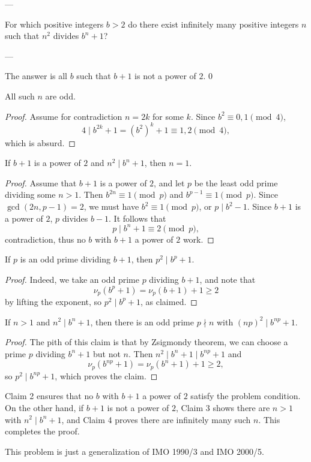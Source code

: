 
---

For which positive integers $b>2$ do there exist infinitely many positive integers $n$ such that $n^2$ divides $b^n+1$?

---

The answer is all $b$ such that $b+1$ is not a power of $2$.
\setcounter{iclaim}0
\begin{iclaim}
    All such $n$ are odd.
\end{iclaim}
\begin{proof}
    Assume for contradiction $n=2k$ for some $k$. Since $b^2\equiv0,1\pmod4$, \[4\mid b^{2k}+1=\left(b^2\right)^k+1\equiv1,2\pmod4,\]
    which is absurd.
\end{proof}
\begin{iclaim}
    If $b+1$ is a power of $2$ and $n^2\mid b^n+1$, then $n=1$.
\end{iclaim}
\begin{proof}
    Assume that $b+1$ is a power of $2$, and let $p$ be the least odd prime dividing some $n>1$. Then $b^{2n}\equiv1\pmod p$ and $b^{p-1}\equiv1\pmod p$. Since $\gcd(2n,p-1)=2$, we must have $b^2\equiv1\pmod p$, or $p\mid b^2-1$. Since $b+1$ is a power of $2$, $p$ divides $b-1$. It follows that \[p\mid b^n+1\equiv2\pmod p,\]
    contradiction, thus no $b$ with $b+1$ a power of $2$ work.
\end{proof}
\begin{iclaim}
    If $p$ is an odd prime dividing $b+1$, then $p^2\mid b^p+1$.
\end{iclaim}
\begin{proof}
    Indeed, we take an odd prime $p$ dividing $b+1$, and note that \[\nu_p\left(b^p+1\right)=\nu_p(b+1)+1\ge2\]
    by lifting the exponent, so $p^2\mid b^p+1$, as claimed.
\end{proof}
\begin{iclaim}
    If $n>1$ and $n^2\mid b^n+1$, then there is an odd prime $p\nmid n$ with $(np)^2\mid b^{np}+1$.
\end{iclaim}
\begin{proof}
    The pith of this claim is that by Zsigmondy theorem, we can choose a prime $p$ dividing $b^n+1$ but not $n$. Then $n^2\mid b^n+1\mid b^{np}+1$ and \[\nu_p\left(b^{np}+1\right)=\nu_p\left(b^n+1\right)+1\ge2,\]
    so $p^2\mid b^{np}+1$, which proves the claim.
\end{proof}

Claim 2 ensures that no $b$ with $b+1$ a power of $2$ satisfy the problem condition. On the other hand, if $b+1$ is not a power of $2$, Claim 3 shows there are $n>1$ with $n^2\mid b^n+1$, and Claim 4 proves  there are infinitely many such $n$. This completes the proof.
\begin{boxremark}
    This problem is just a generalization of IMO 1990/3 and IMO 2000/5.
\end{boxremark}



